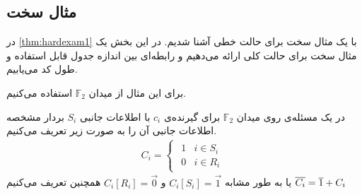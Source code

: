 \subsection{
	مثال سخت
}
در 
\autoref{thm:hardexam1}
با یک مثال سخت برای حالت خطی آشنا شدیم. در این بخش یک مثال سخت برای حالت کلی ارائه می‌دهیم و رابطه‌ای بین اندازه جدول قابل استفاده و طول کد می‌یابیم.

برای این مثال از میدان 
$\mathbb{F}_2$
استفاده می‌کنیم.

\begin{definition}
	در یک مسئله‌ی
	\picod
	روی میدان
	$\mathbb{F}_2$
	برای گیرنده‌ی 
	$c_i$
	با اطلاعات جانبی
	$S_i$
	بردار مشخصه اطلاعات جانبی آن را به صورت زیر تعریف می‌کنیم.
	\begin{align}
		C_i =
		\begin{cases}
			\begin{array}{ll}
			1 & i \in S_i \\
			0 &  i \in R_i
		\end{array}
		\end{cases}
	\end{align}
	یا به طور مشابه
	$C_i[S_i] = \vec{1}$
	و
	$ C_i[R_i] = \vec{0}$
	همچنین تعریف می‌کنیم
	$\overline{C_i} = \overline{1} + C_i$
\end{definition}

